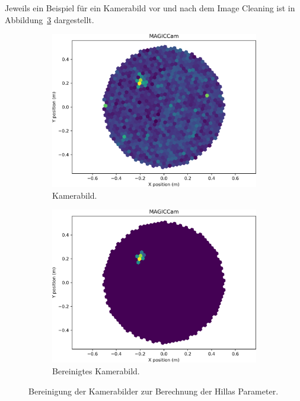 Jeweils ein Beispiel für ein Kamerabild vor und nach dem Image Cleaning ist in
Abbildung~\ref{fig:cleaning} dargestellt.

\begin{figure}[htpb]
  \centering
  \begin{subfigure}[c]{0.48\linewidth}
    \includegraphics[width=\linewidth]{pictures/uncleaned.png}
    \caption{Kamerabild.}%
    \label{fig:uncleaned}
  \end{subfigure}
  \begin{subfigure}[c]{0.48\linewidth}
    \includegraphics[width=\linewidth]{pictures/cleaned.png}
    \caption{Bereinigtes Kamerabild.}%
    \label{fig:cleaned}
  \end{subfigure}
  \caption{Bereinigung der Kamerabilder zur Berechnung der Hillas Parameter.}%
  \label{fig:cleaning}
\end{figure}

